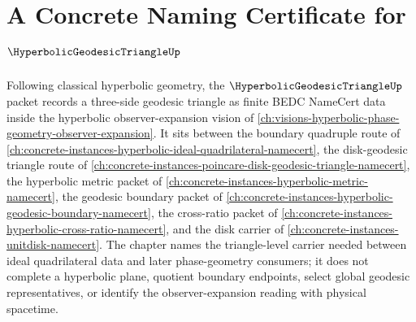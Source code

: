 \chapter{A Concrete Naming Certificate for $\HyperbolicGeodesicTriangleUp$}
\label{ch:concrete-instances-hyperbolic-geodesic-triangle-namecert}

Following classical hyperbolic geometry, the $\HyperbolicGeodesicTriangleUp$ packet records a three-side geodesic triangle as finite BEDC NameCert data inside the hyperbolic observer-expansion vision of \autoref{ch:visions-hyperbolic-phase-geometry-observer-expansion}. It sits between the boundary quadruple route of \autoref{ch:concrete-instances-hyperbolic-ideal-quadrilateral-namecert}, the disk-geodesic triangle route of \autoref{ch:concrete-instances-poincare-disk-geodesic-triangle-namecert}, the hyperbolic metric packet of \autoref{ch:concrete-instances-hyperbolic-metric-namecert}, the geodesic boundary packet of \autoref{ch:concrete-instances-hyperbolic-geodesic-boundary-namecert}, the cross-ratio packet of \autoref{ch:concrete-instances-hyperbolic-cross-ratio-namecert}, and the disk carrier of \autoref{ch:concrete-instances-unitdisk-namecert}. The chapter names the triangle-level carrier needed between ideal quadrilateral data and later phase-geometry consumers; it does not complete a hyperbolic plane, quotient boundary endpoints, select global geodesic representatives, or identify the observer-expansion reading with physical spacetime.

